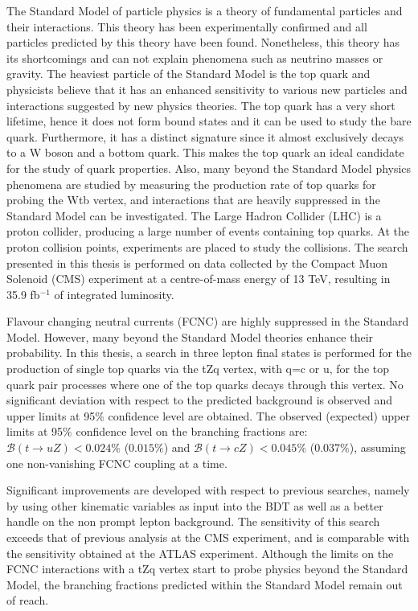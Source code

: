 The Standard Model of particle physics is a theory of fundamental particles and their interactions. This theory has been experimentally confirmed and all particles predicted by this theory have been found. Nonetheless, this theory has its shortcomings and can not explain phenomena such as neutrino masses or gravity. The heaviest particle of the Standard Model is the top quark and physicists believe that it has an enhanced sensitivity to various new particles and interactions suggested by new physics theories. The top quark has a very short lifetime, hence it does not form bound states and it can be used to study the bare quark. Furthermore, it has a distinct signature since it almost exclusively decays to a W boson and a bottom quark. This makes the top quark an ideal candidate for the study of quark properties. Also, many beyond the Standard Model physics phenomena are studied by measuring the production rate of top quarks for probing the Wtb vertex, and interactions that are heavily suppressed in the Standard Model can be investigated. The Large Hadron Collider (LHC) is a proton collider, producing a large number of events containing top quarks. At the proton collision points, experiments are placed to study the collisions. The search presented in this thesis is performed on data collected by the Compact Muon Solenoid (CMS) experiment at a centre-of-mass energy of 13 TeV, resulting in 35.9 fb$^{-1}$ of integrated luminosity. 


Flavour changing neutral currents (FCNC) are highly suppressed in the Standard Model. However, many beyond the Standard Model theories enhance their probability. In this thesis, a search in three lepton final states is performed for the production of single top quarks via the tZq vertex, with q=c or u, for the top quark pair processes where one of the top quarks decays through this vertex.  No significant deviation with respect to the predicted background is observed and upper limits at 95\% confidence level are obtained. The observed (expected) upper limits at 95$\%$ confidence level  on the branching fractions are: ${\mathcal{B}}(t \rightarrow uZ) < 0.024\%$ ($0.015\%$) and ${\mathcal{B}}(t \rightarrow cZ) < 0.045\%$ (0.037$\%$), assuming one non-vanishing FCNC coupling at a time. 


Significant improvements are developed with respect to previous searches, namely by using other kinematic variables as input into the BDT as well as a better handle on the non prompt lepton background.  The sensitivity of this search exceeds that of previous analysis at the CMS experiment, and is comparable with the sensitivity obtained at the ATLAS experiment. Although the limits on the FCNC interactions with a tZq vertex start to probe physics beyond the Standard Model, the branching fractions predicted within the Standard Model remain out of reach. 